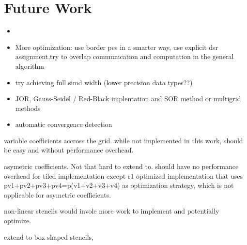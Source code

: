 \chapter{Future Work}
\begin{itemize}
    \item 
    \item More optimization: use border \acp{pe} in a smarter way, use explicit \ac{dsr} assignment,try to overlap communication and computation in the general algorithm
    \item try achieving full simd width (lower precision data types??)
    \item JOR, Gauss-Seidel / Red-Black implentation and SOR method or multigrid methods
    \item automatic convergence detection
\end{itemize} 


variable coefficients accross the grid. while not implemented in this work, should be easy and without performance overhead.

asymetric coefficients. Not that hard to extend to. should have no performance overhead for tiled implementation except r1 optimized implementation that uses pv1+pv2+pv3+pv4=p(v1+v2+v3+v4) as optimization strategy, which is not applicable for asymetric coefficients.

non-linear stencils would invole more work to implement and potentially optimize.

extend to box shaped stencils,
